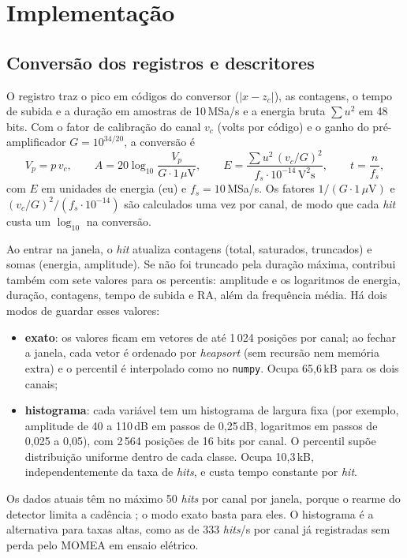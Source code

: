 \documentclass[12pt]{article}
\begin{document}
\section{Implementação}
\label{sec:implementacao}

\subsection{Conversão dos registros e descritores}

O registro traz o pico em códigos do conversor (\(|x - z_c|\)), as contagens, o tempo de subida e a duração em amostras de 10\,MSa/s e a energia bruta \(\sum u^2\) em 48 bits. Com o fator de calibração do canal \(v_c\) (volts por código) e o ganho do pré-amplificador \(G = 10^{34/20}\), a conversão é
\begin{equation}
	V_p = p\, v_c, \qquad
	A = 20 \log_{10}\frac{V_p}{G \cdot 1\,\mu\mathrm{V}}, \qquad
	E = \frac{\sum u^2\, (v_c/G)^2}{f_s \cdot 10^{-14}\,\mathrm{V^2 s}}, \qquad
	t = \frac{n}{f_s},
	\label{eq:conversao}
\end{equation}
com \(E\) em unidades de energia (eu) e \(f_s = 10\,\)MSa/s. Os fatores \(1/(G \cdot 1\,\mu\mathrm{V})\) e \((v_c/G)^2/(f_s \cdot 10^{-14})\) são calculados uma vez por canal, de modo que cada \textit{hit} custa um \(\log_{10}\) na conversão.

Ao entrar na janela, o \textit{hit} atualiza contagens (total, saturados, truncados) e somas (energia, amplitude). Se não foi truncado pela duração máxima, contribui também com sete valores para os percentis: amplitude e os logaritmos de energia, duração, contagens, tempo de subida e RA, além da frequência média. Há dois modos de guardar esses valores:
\begin{itemize}
	\item \textbf{exato}: os valores ficam em vetores de até 1\,024 posições por canal; ao fechar a janela, cada vetor é ordenado por \textit{heapsort} (sem recursão nem memória extra) e o percentil é interpolado como no \texttt{numpy}. Ocupa 65,6\,kB para os dois canais;
	\item \textbf{histograma}: cada variável tem um histograma de largura fixa (por exemplo, amplitude de 40 a 110\,dB em passos de 0,25\,dB, logaritmos em passos de 0,025 a 0,05), com 2\,564 posições de 16 bits por canal. O percentil supõe distribuição uniforme dentro de cada classe. Ocupa 10,3\,kB, independentemente da taxa de \textit{hits}, e custa tempo constante por \textit{hit}.
\end{itemize}
Os dados atuais têm no máximo 50 \textit{hits} por canal por janela, porque o rearme do detector limita a cadência \cite{mlpbomba2026}; o modo exato basta para eles. O histograma é a alternativa para taxas altas, como as de 333 \textit{hits}/s por canal já registradas sem perda pelo MOMEA em ensaio elétrico.
\end{document}
